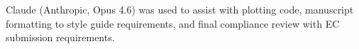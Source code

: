 Claude (Anthropic, Opus 4.6) was used to assist with plotting code, manuscript formatting to style guide requirements, and final compliance review with EC submission requirements.

